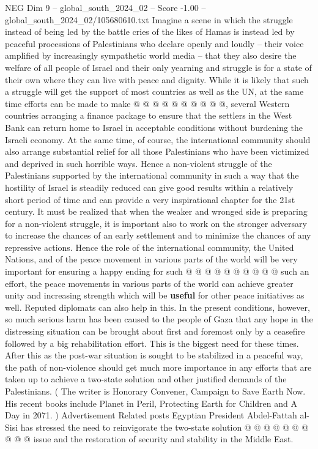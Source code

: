 \begin{textsample}{NEG Dim 9 – global\_south\_2024\_02 – Score -1.00 – global\_south\_2024\_02/105680610.txt}
Imagine a scene in which the struggle instead of being led by the battle cries of the likes of Hamas is instead led by peaceful processions of Palestinians who declare openly and loudly -- their voice amplified by increasingly sympathetic world media -- that they also desire the welfare of all people of Israel and their only yearning and struggle is for a state of their own where they can live with peace and dignity.
While it is likely that such a struggle will get the support of most countries as well as the UN, at the same time efforts can be made to make @ @ @ @ @ @ @ @ @ @, several Western countries arranging a finance package to ensure that the settlers in the West Bank can return home to Israel in acceptable conditions without burdening the Israeli economy.
At the same time, of course, the international community should also arrange substantial relief for all those Palestinians who have been victimized and deprived in such horrible ways.
Hence a non-violent struggle of the Palestinians supported by the international community in such a way that the hostility of Israel is steadily reduced can give good results within a relatively short period of time and can provide a very inspirational chapter for the 21st century.
It must be realized that when the weaker and wronged side is preparing for a non-violent struggle, it is important also to work on the stronger adversary to increase the chances of an early settlement and to minimize the chances of any repressive actions.
Hence the role of the international community, the United Nations, and of the peace movement in various parts of the world will be very important for ensuring a happy ending for such @ @ @ @ @ @ @ @ @ @ such an effort, the peace movements in various parts of the world can achieve greater unity and increasing strength which will be \textbf{useful} for other peace initiatives as well.
Reputed diplomats can also help in this.
In the present conditions, however, so much serious harm has been caused to the people of Gaza that any hope in the distressing situation can be brought about first and foremost only by a ceasefire followed by a big rehabilitation effort.
This is the biggest need for these times.
After this as the post-war situation is sought to be stabilized in a peaceful way, the path of non-violence should get much more importance in any efforts that are taken up to achieve a two-state solution and other justified demands of the Palestinians. ( The writer is Honorary Convener, Campaign to Save Earth Now.
His recent books include Planet in Peril, Protecting Earth for Children and A Day in 2071. ) Advertisement Related posts Egyptian President Abdel-Fattah al-Sisi has stressed the need to reinvigorate the two-state solution @ @ @ @ @ @ @ @ @ @ issue and the restoration of security and stability in the Middle East.

\end{textsample}
